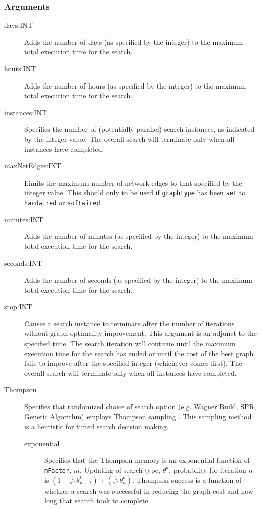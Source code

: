 	\subsubsection{Arguments}
	\begin{description}
		\item[days:INT] Adds the number of days (as specified by the integer) to the 
		maximum total execution time for the search.
		
		\item[hours:INT] Adds the number of hours (as specified by the integer) to the 
		maximum total execution time for the search.
		
		\item[instances:INT] Specifies the number of (potentially parallel) search instances,
		as indicated by the integer value.  The overall search will terminate only when  
		all instances have completed.
		
		\item[maxNetEdges:INT] Limits the maximum number of network edges to that
		specified by the integer value. This should only to be used if \texttt{graphtype}
		has been \texttt{set} to \texttt{hardwired} or \texttt{softwired}. 
		
		\item[minutes:INT] Adds the number of minutes (as specified by the integer) to 
		the maximum total execution time for the search.
		
		\item[seconds:INT] Adds the number of seconds (as specified by the integer) to the 
		maximum total execution time for the search.

		\item[stop:INT] Causes a search instance to terminate after the number of iterations 
		without graph optimality improvement. This argument is an adjunct to the specified time. 
		The search iteration will continue until the maximum execution time for the search has ended
		or until the cost of the best graph fails to improve after the specified integer (whichever comes first).
		The overall search will terminate only when all instances have completed.
		
		\item[Thompson] Specifies that randomized choice of search option (e.g. Wagner 
		Build, SPR, Genetic Algorithm) employs Thompson sampling \citep{Thompson1933}. This
		sampling method is a heuristic for timed search decision making.
				
			\begin{description}
			\item[exponential] Specifies that the Thompson memory is an exponential function of 
			\texttt{mFactor}, $m$.  Updating of search type, $\theta^k$, probability for iteration 
			$n$ is $ \left(1 - \frac{1}{2^m} \theta^k_{n-1}\right) + \left(\frac{1}{2^m} \theta^k_n \right)$.  
			Thompson success is a function of whether a search was successful in reducing the graph 
			cost and how long that search took to complete.
			

\end{description}
\end{description}
